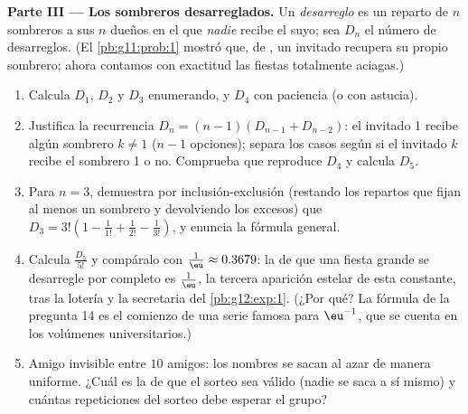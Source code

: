 \begin{problem}
\medskip
\noindent\textbf{Parte III --- Los sombreros desarreglados.}
Un \emph{desarreglo} es un reparto de $n$ sombreros a sus $n$ dueños en el
que \emph{nadie} recibe el suyo; sea $D_n$ el número de desarreglos. (El
\cref{pb:g11:prob:1} mostró que, de , un invitado recupera su propio
sombrero; ahora contamos con exactitud las fiestas totalmente aciagas.)
\begin{enumerate}[resume]
  \item Calcula $D_1$, $D_2$ y $D_3$ enumerando, y $D_4$ con paciencia (o
        con astucia).
  \item Justifica la recurrencia $D_n = (n - 1)\left(D_{n-1} +
        D_{n-2}\right)$: el invitado 1 recibe algún sombrero $k \neq 1$
        ($n - 1$ opciones); separa los casos según si el invitado $k$ recibe
        el sombrero 1 o no. Comprueba que reproduce $D_4$ y calcula $D_5$.
  \item Para $n = 3$, demuestra por inclusión-exclusión (restando los
        repartos que fijan al menos un sombrero y devolviendo los excesos)
        que
        $D_3 = 3!\left(1 - \frac{1}{1!} + \frac{1}{2!} -
        \frac{1}{3!}\right)$, y enuncia la fórmula general.
  \item Calcula $\frac{D_5}{5!}$ y compáralo con
        $\frac1\eu \approx 0.3679$: la  de que una fiesta
        grande se desarregle por completo es $\frac1\eu$, la tercera
        aparición estelar de esta constante, tras la lotería y la
        secretaria del \cref{pb:g12:exp:1}. (¿Por qué? La fórmula de la
        pregunta 14 es el comienzo de una serie famosa para $\eu^{-1}$, que
        se cuenta en los volúmenes universitarios.)
  \item Amigo invisible entre $10$ amigos: los nombres se sacan al azar de
        manera uniforme. ¿Cuál es la  de que el sorteo sea
        válido (nadie se saca a sí mismo) y cuántas repeticiones del sorteo
        debe esperar el grupo?
\end{enumerate}


\end{problem}
